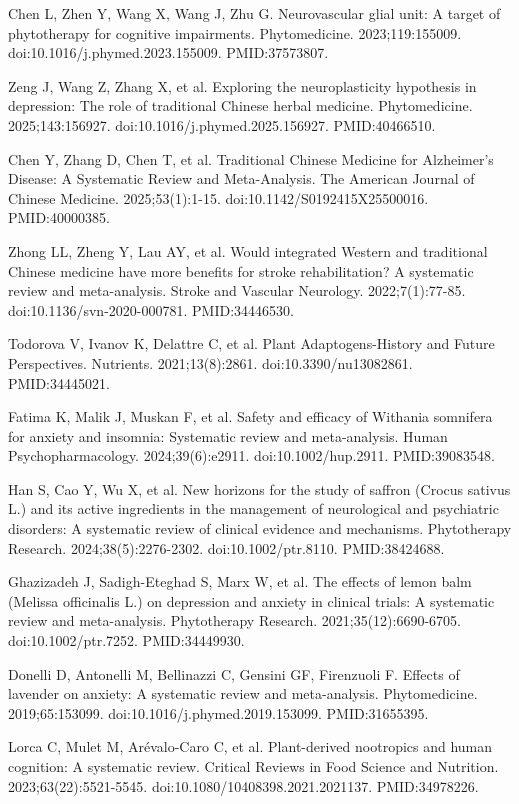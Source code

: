 \documentclass[12pt,oneside]{book}
\newcommand{\reff}[2]{\par\hangindent=7mm\hangafter=1\noindent[#1]\hspace{2mm}#2\par}
\begin{document}
\reff{41}{Chen L, Zhen Y, Wang X, Wang J, Zhu G. Neurovascular glial unit: A target of phytotherapy for cognitive impairments. Phytomedicine. 2023;119:155009. doi:10.1016/j.phymed.2023.155009. PMID:37573807.}

\reff{42}{Zeng J, Wang Z, Zhang X, et al. Exploring the neuroplasticity hypothesis in depression: The role of traditional Chinese herbal medicine. Phytomedicine. 2025;143:156927. doi:10.1016/j.phymed.2025.156927. PMID:40466510.}

\reff{43}{Chen Y, Zhang D, Chen T, et al. Traditional Chinese Medicine for Alzheimer's Disease: A Systematic Review and Meta-Analysis. The American Journal of Chinese Medicine. 2025;53(1):1-15. doi:10.1142/S0192415X25500016. PMID:40000385.}

\reff{44}{Zhong LL, Zheng Y, Lau AY, et al. Would integrated Western and traditional Chinese medicine have more benefits for stroke rehabilitation? A systematic review and meta-analysis. Stroke and Vascular Neurology. 2022;7(1):77-85. doi:10.1136/svn-2020-000781. PMID:34446530.}

\reff{45}{Todorova V, Ivanov K, Delattre C, et al. Plant Adaptogens-History and Future Perspectives. Nutrients. 2021;13(8):2861. doi:10.3390/nu13082861. PMID:34445021.}

\reff{46}{Fatima K, Malik J, Muskan F, et al. Safety and efficacy of Withania somnifera for anxiety and insomnia: Systematic review and meta-analysis. Human Psychopharmacology. 2024;39(6):e2911. doi:10.1002/hup.2911. PMID:39083548.}

\reff{47}{Han S, Cao Y, Wu X, et al. New horizons for the study of saffron (Crocus sativus L.) and its active ingredients in the management of neurological and psychiatric disorders: A systematic review of clinical evidence and mechanisms. Phytotherapy Research. 2024;38(5):2276-2302. doi:10.1002/ptr.8110. PMID:38424688.}

\reff{48}{Ghazizadeh J, Sadigh-Eteghad S, Marx W, et al. The effects of lemon balm (Melissa officinalis L.) on depression and anxiety in clinical trials: A systematic review and meta-analysis. Phytotherapy Research. 2021;35(12):6690-6705. doi:10.1002/ptr.7252. PMID:34449930.}

\reff{49}{Donelli D, Antonelli M, Bellinazzi C, Gensini GF, Firenzuoli F. Effects of lavender on anxiety: A systematic review and meta-analysis. Phytomedicine. 2019;65:153099. doi:10.1016/j.phymed.2019.153099. PMID:31655395.}

\reff{50}{Lorca C, Mulet M, Arévalo-Caro C, et al. Plant-derived nootropics and human cognition: A systematic review. Critical Reviews in Food Science and Nutrition. 2023;63(22):5521-5545. doi:10.1080/10408398.2021.2021137. PMID:34978226.}
\end{document}
